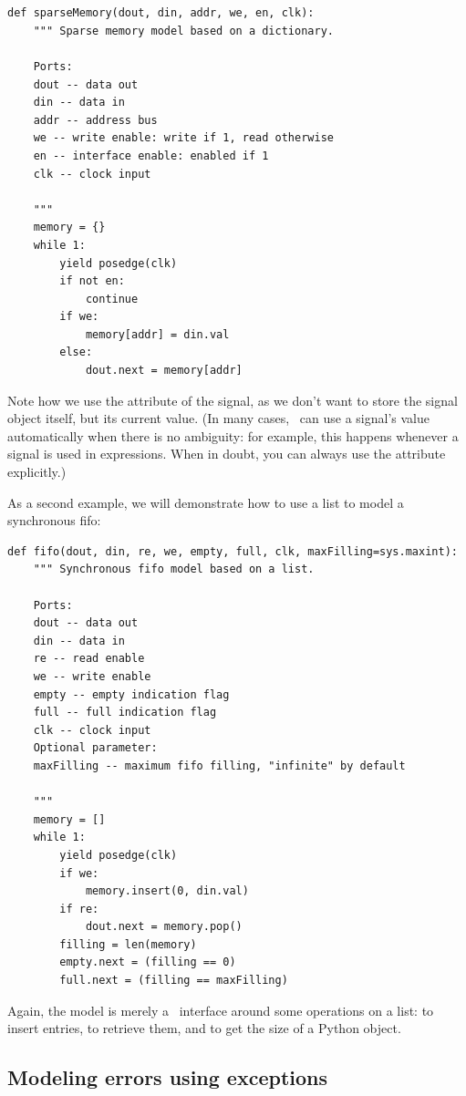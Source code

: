\begin{verbatim}


def sparseMemory(dout, din, addr, we, en, clk):
    """ Sparse memory model based on a dictionary.

    Ports:
    dout -- data out
    din -- data in
    addr -- address bus
    we -- write enable: write if 1, read otherwise
    en -- interface enable: enabled if 1
    clk -- clock input
    
    """
    memory = {}
    while 1:
        yield posedge(clk)
        if not en:
            continue
        if we:
            memory[addr] = din.val
        else:
            dout.next = memory[addr]
\end{verbatim} 

Note how we use the  attribute of the  signal, as
we don't want to store the signal object itself, but its current
value. (In many cases, \myhdl\ can use a signal's value automatically
when there is no ambiguity: for example, this happens whenever a
signal is used in expressions. When in doubt, you can always use the
 attribute explicitly.)

As a second example, we will demonstrate how to use a list to model a
synchronous fifo:

\begin{verbatim}
def fifo(dout, din, re, we, empty, full, clk, maxFilling=sys.maxint):
    """ Synchronous fifo model based on a list.

    Ports:
    dout -- data out
    din -- data in
    re -- read enable
    we -- write enable
    empty -- empty indication flag
    full -- full indication flag
    clk -- clock input
    Optional parameter:
    maxFilling -- maximum fifo filling, "infinite" by default

    """
    memory = []
    while 1:
        yield posedge(clk)
        if we:
            memory.insert(0, din.val)
        if re:
            dout.next = memory.pop()
        filling = len(memory)
        empty.next = (filling == 0)
        full.next = (filling == maxFilling)
\end{verbatim}

Again, the model is merely a \myhdl\ interface around some operations
on a list:  to insert entries,  to
retrieve them, and  to get the size of a Python
object.

\subsection{Modeling errors using exceptions \label{model-err}}

